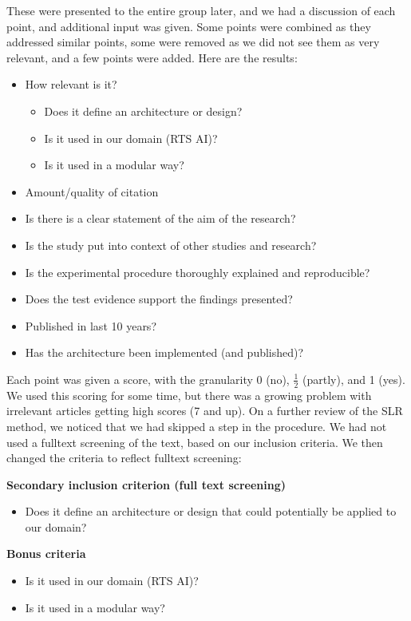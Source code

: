 These were presented to the entire group later, and we had a discussion of each point, and additional input was given. Some points were combined as they addressed similar points, some were removed as we did not see them as very relevant, and a few points were added. Here are the results:
\begin{itemize}
\item How relevant is it?
\begin{itemize}
\item Does it define an architecture or design?
\item Is it used in our domain (RTS AI)?
\item Is it used in a modular way?
\end{itemize}
\item Amount/quality of citation 
\item Is there is a clear statement of the aim of the research?
\item Is the study put into context of other studies and research?
\item Is the experimental procedure thoroughly explained and reproducible?
\item Does the test evidence support the findings presented?
\item Published in last 10 years?
\item Has the architecture been implemented (and published)?
\end{itemize}

Each point was given a score, with the granularity 0 (no), $\frac{1}{2}$ (partly), and 1 (yes). We used this scoring for some time, but there was a growing problem with irrelevant articles getting high scores (7 and up). On a further review of the SLR method, we noticed that we had skipped a step in the procedure. We had not used a fulltext screening of the text, based on our inclusion criteria. We then changed the criteria to reflect fulltext screening:

\textbf{Secondary inclusion criterion (full text screening)}
\begin{itemize}
\item Does it define an architecture or design that could potentially be applied to our domain?
\end{itemize}

\textbf{Bonus criteria}
\begin{itemize}
\item Is it used in our domain (RTS AI)?
\item Is it used in a modular way?
\end{itemize}

